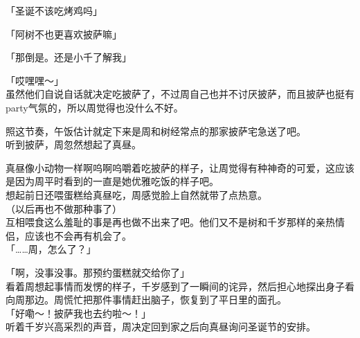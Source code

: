 「圣诞不该吃烤鸡吗」

「阿树不也更喜欢披萨嘛」

「那倒是。还是小千了解我」

「哎嘿嘿～」\\

虽然他们自说自话就决定吃披萨了，不过周自己也并不讨厌披萨，而且披萨也挺有party气氛的，所以周觉得也没什么不好。

照这节奏，午饭估计就定下来是周和树经常点的那家披萨宅急送了吧。\\

听到披萨，周忽然想起了真昼。

真昼像小动物一样啊呜啊呜嚼着吃披萨的样子，让周觉得有种神奇的可爱，这应该是因为周平时看到的一直是她优雅吃饭的样子吧。\\

想起前日还喂蛋糕给真昼吃，周感觉脸上自然就带了点热意。\\

（以后再也不做那种事了）\\

互相喂食这么羞耻的事是再也做不出来了吧。他们又不是树和千岁那样的亲热情侣，应该也不会再有机会了。\\

「……周，怎么了？」

「啊，没事没事。那预约蛋糕就交给你了」\\

看着周想起事情而发愣的样子，千岁感到了一瞬间的诧异，然后担心地探出身子看向周那边。周慌忙把那件事情赶出脑子，恢复到了平日里的面孔。\\

「好嘞～！披萨我也去约啦～！」\\

听着千岁兴高采烈的声音，周决定回到家之后向真昼询问圣诞节的安排。
